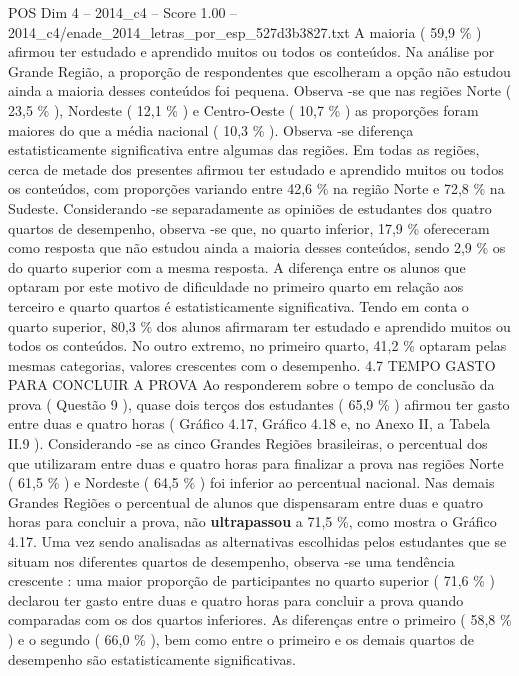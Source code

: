 \begin{textsample}{POS Dim 4 – 2014\_c4 – Score 1.00 – 2014\_c4/enade\_2014\_letras\_por\_esp\_527d3b3827.txt}
A maioria ( 59,9 \% ) afirmou ter estudado e aprendido muitos ou todos os conteúdos.
Na análise por Grande Região, a proporção de respondentes que escolheram a opção não estudou ainda a maioria desses conteúdos foi pequena.
Observa -se que nas regiões Norte ( 23,5 \% ), Nordeste ( 12,1 \% ) e Centro-Oeste ( 10,7 \% ) as proporções foram maiores do que a média nacional ( 10,3 \% ).
Observa -se diferença estatisticamente significativa entre algumas das regiões.
Em todas as regiões, cerca de metade dos presentes afirmou ter estudado e aprendido muitos ou todos os conteúdos, com proporções variando entre 42,6 \% na região Norte e 72,8 \% na Sudeste.
Considerando -se separadamente as opiniões de estudantes dos quatro quartos de desempenho, observa -se que, no quarto inferior, 17,9 \% ofereceram como resposta que não estudou ainda a maioria desses conteúdos, sendo 2,9 \% os do quarto superior com a mesma resposta.
A diferença entre os alunos que optaram por este motivo de dificuldade no primeiro quarto em relação aos terceiro e quarto quartos é estatisticamente significativa.
Tendo em conta o quarto superior, 80,3 \% dos alunos afirmaram ter estudado e aprendido muitos ou todos os conteúdos.
No outro extremo, no primeiro quarto, 41,2 \% optaram pelas mesmas categorias, valores crescentes com o desempenho. 4.7 TEMPO GASTO PARA CONCLUIR A PROVA Ao responderem sobre o tempo de conclusão da prova ( Questão 9 ), quase dois terços dos estudantes ( 65,9 \% ) afirmou ter gasto entre duas e quatro horas ( Gráfico 4.17, Gráfico 4.18 e, no Anexo II, a Tabela II.9 ).
Considerando -se as cinco Grandes Regiões brasileiras, o percentual dos que utilizaram entre duas e quatro horas para finalizar a prova nas regiões Norte ( 61,5 \% ) e Nordeste ( 64,5 \% ) foi inferior ao percentual nacional.
Nas demais Grandes Regiões o percentual de alunos que dispensaram entre duas e quatro horas para concluir a prova, não \textbf{ultrapassou} a 71,5 \%, como mostra o Gráfico 4.17.
Uma vez sendo analisadas as alternativas escolhidas pelos estudantes que se situam nos diferentes quartos de desempenho, observa -se uma tendência crescente : uma maior proporção de participantes no quarto superior ( 71,6 \% ) declarou ter gasto entre duas e quatro horas para concluir a prova quando comparadas com os dos quartos inferiores.
As diferenças entre o primeiro ( 58,8 \% ) e o segundo ( 66,0 \% ), bem como entre o primeiro e os demais quartos de desempenho são estatisticamente significativas.

\end{textsample}

